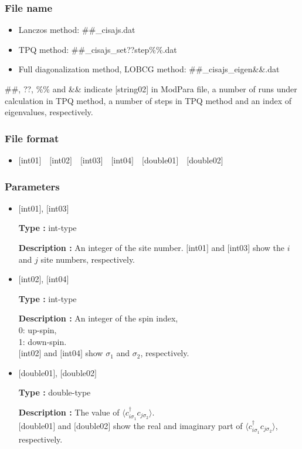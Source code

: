\subsubsection{File name}
 \begin{itemize}
   \item{Lanczos method:}  \#\#\_cisajs.dat
   \item{TPQ method:} \#\#\_cisajs\_set??step\%\%.dat
   \item{Full diagonalization method, LOBCG method:}  \#\#\_cisajs\_eigen{\&\&}.dat
  \end{itemize}
  \#\#, ??, \%\% and \&\& indicate [string02] in ModPara file, a number of runs under calculation in TPQ method, a number of steps in TPQ method and an index of eigenvalues, respectively.


\subsubsection{File format}
 \begin{itemize}
   \item  $[$int01$]$~~$[$int02$]$~~$[$int03$]$~~$[$int04$]$~~$[$double01$]$~~$[$double02$]$
  \end{itemize}
\subsubsection{Parameters}
 \begin{itemize}

  \item  $[$int01$]$, $[$int03$]$

 {\bf Type :} int-type

{\bf Description :} An integer of the site number. $[$int01$]$ and $[$int03$]$ show the $i$ and $j$ site numbers, respectively.
 
  \item  $[$int02$]$, $[$int04$]$

 {\bf Type :} int-type 

{\bf Description :} An integer of the spin index,\\
   0: up-spin,\\
   1: down-spin.\\ 
$[$int02$]$ and $[$int04$]$ show $\sigma_1$ and $\sigma_2$, respectively. \\

  \item  $[$double01$]$, $[$double02$]$

 {\bf Type :} double-type 

{\bf Description :} The value of $\langle c_{i\sigma_1}^{\dagger}c_{j\sigma_2}\rangle$.\\
$[$double01$]$ and $[$double02$]$ show the real and imaginary part of $\langle c_{i\sigma_1}^{\dagger}c_{j\sigma_2}\rangle$, respectively.
\end{itemize}

